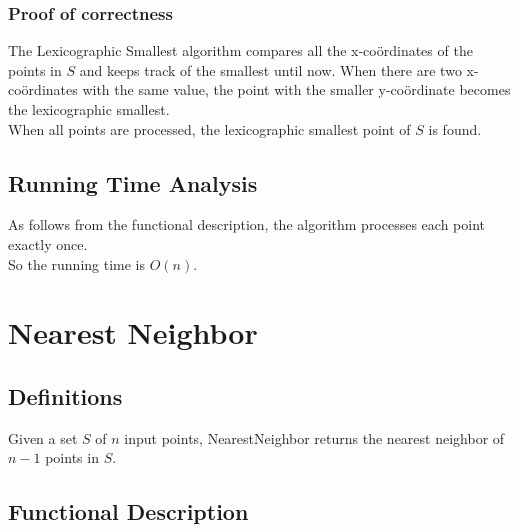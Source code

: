     \subsubsection{Proof of correctness}
    \label{ssub:proof}
      \noindent The Lexicographic Smallest algorithm compares all the x-co\"ordinates of the points in $S$ and keeps track of the smallest until now. When there are two x-co\"ordinates with the same value, the point with the smaller y-co\"ordinate becomes the lexicographic smallest.\\ When all points are processed, the lexicographic smallest point of $S$ is found.
    

    \subsection{Running Time Analysis}
    \label{sub:running_time_analysis}
      As follows from the functional description, the algorithm processes each point exactly once.\\
      So the running time is $O(n)$.


  \section{Nearest Neighbor}
  \label{sec:nearest_neighbor}

    \subsection{Definitions}
    \label{sub:definitions}
      \begin{definition} \label{def:nn}
          Given a set $S$ of $n$ input points, NearestNeighbor returns the nearest neighbor of $n-1$ points in $S$.
      \end{definition}
      
    \subsection{Functional Description}
    \label{sub:functional_description}
    
